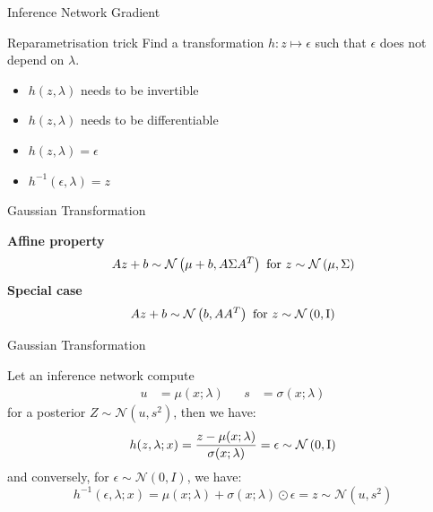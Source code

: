 \begin{frame}{Inference Network Gradient}
\begin{block}{Reparametrisation trick}
Find a transformation $ h: z \mapsto \epsilon $ such that $ \epsilon $ does not depend on $ \lambda $.
\begin{itemize}
\item $ h(z, \lambda) $ needs to be invertible
\item $ h(z, \lambda) $ needs to be differentiable
\pause
\item $ h(z, \lambda) = \epsilon $
\item $ h^{-1}(\epsilon, \lambda) = z $ 
\end{itemize}
\end{block}
\end{frame}

\begin{frame}{Gaussian Transformation}

\textbf{Affine property}
\begin{equation*}
Az + b \sim \mathcal{N}\left(\mu + b,A\Sigma A^{T}\right) \text{ for } z \sim \mathcal{N}\left(\mu,\Sigma\right)
\end{equation*}
\pause
\textbf{Special case}
\begin{equation*}
Az + b \sim \mathcal{N}\left(b,A A^{T}\right) \text{ for } z \sim \mathcal{N}\left(0,\operatorname{I}\right)
\end{equation*}

\end{frame}

\begin{frame}{Gaussian Transformation}

Let an inference network compute
\begin{equation*}
\begin{aligned}
u &= \mu(x;\lambda) & & s&= \sigma(x;\lambda)
\end{aligned}
\end{equation*}
for a posterior $Z \sim \mathcal N(u, s^2)$, then we have: \pause
\begin{equation*}
h(z, \lambda; x) = \frac{z - \mu(x;\lambda)}{ \sigma(x; \lambda) } = \epsilon \sim \mathcal{N}\left(0,\operatorname{I}\right) 
\end{equation*} \pause
and conversely, for $\epsilon \sim \mathcal N(0, I)$, we have:
\begin{equation*}
h^{-1}(\epsilon, \lambda; x) = \mu(x;\lambda) + \sigma(x; \lambda) \odot \epsilon = z  \sim \mathcal N(u, s^2)
\end{equation*}

\end{frame}

